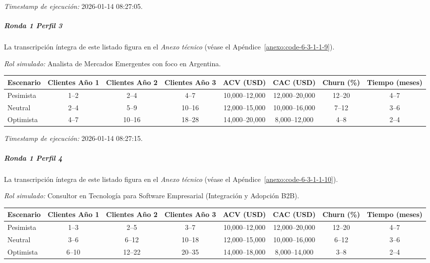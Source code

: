 \textit{Timestamp de ejecución:} 2026-01-14 08:27:05.

\subparagraph{Ronda 1 Perfil 3}

La transcripción íntegra de este listado figura en el \textit{Anexo técnico} (véase el Apéndice~\ref{anexo:code-6-3-1-1-9}).

\textit{Rol simulado:} Analista de Mercados Emergentes con foco en Argentina.

\begin{center}
\footnotesize
\begin{adjustbox}{max width=\textwidth}
\begin{tabular}{|l|c|c|c|c|c|c|c|}
\hline
\textbf{Escenario} & \textbf{Clientes Año 1} & \textbf{Clientes Año 2} & \textbf{Clientes Año 3} & \textbf{ACV (USD)} & \textbf{CAC (USD)} & \textbf{Churn (\%)} & \textbf{Tiempo (meses)} \\
\hline
Pesimista & 1--2 & 2--4 & 4--7 & 10,000--12,000 & 12,000--20,000 & 12--20 & 4--7 \\
\hline
Neutral & 2--4 & 5--9 & 10--16 & 12,000--15,000 & 10,000--16,000 & 7--12 & 3--6 \\
\hline
Optimista & 4--7 & 10--16 & 18--28 & 14,000--20,000 & 8,000--12,000 & 4--8 & 2--4 \\
\hline
\end{tabular}
\end{adjustbox}
\end{center}

\textit{Timestamp de ejecución:} 2026-01-14 08:27:15.

\subparagraph{Ronda 1 Perfil 4}

La transcripción íntegra de este listado figura en el \textit{Anexo técnico} (véase el Apéndice~\ref{anexo:code-6-3-1-1-10}).

\textit{Rol simulado:} Consultor en Tecnología para Software Empresarial (Integración y Adopción B2B).

\begin{center}
\footnotesize
\begin{adjustbox}{max width=\textwidth}
\begin{tabular}{|l|c|c|c|c|c|c|c|}
\hline
\textbf{Escenario} & \textbf{Clientes Año 1} & \textbf{Clientes Año 2} & \textbf{Clientes Año 3} & \textbf{ACV (USD)} & \textbf{CAC (USD)} & \textbf{Churn (\%)} & \textbf{Tiempo (meses)} \\
\hline
Pesimista & 1--3 & 2--5 & 3--7 & 10,000--12,000 & 12,000--20,000 & 12--20 & 4--7 \\
\hline
Neutral & 3--6 & 6--12 & 10--18 & 12,000--15,000 & 10,000--16,000 & 6--12 & 3--6 \\
\hline
Optimista & 6--10 & 12--22 & 20--35 & 14,000--18,000 & 8,000--14,000 & 3--8 & 2--4 \\
\hline
\end{tabular}
\end{adjustbox}
\end{center}

